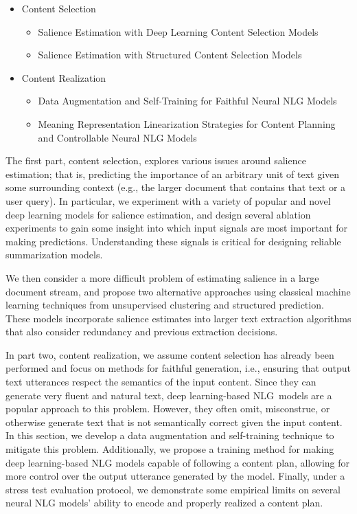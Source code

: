 \begin{itemize}
  \item Content Selection
  \begin{itemize}
    \item Salience Estimation with Deep Learning Content Selection Models
    \item Salience Estimation with Structured Content Selection Models
  \end{itemize}
  \item Content Realization
  \begin{itemize}
    \item Data Augmentation and Self-Training for Faithful Neural NLG Models
    \item Meaning Representation Linearization Strategies for Content Planning
          and Controllable Neural NLG Models
  \end{itemize}
\end{itemize}

The first part, content selection, explores various issues around salience
estimation; that is, predicting the importance of an arbitrary unit of text
given some surrounding context (e.g., the larger document that contains that
text or a user query). In particular, we experiment with a variety of popular
and novel deep learning models for salience estimation, and design several
ablation experiments to gain some insight into which input signals are most
important for making predictions. Understanding these signals is critical for
designing reliable summarization models. 

We then consider a more difficult problem of estimating salience in a large
document stream, and propose two alternative approaches using classical
machine learning techniques from unsupervised clustering and structured
prediction. These models incorporate salience estimates into larger text
extraction algorithms that also consider redundancy and previous extraction
decisions.
    
In part two, content realization, we assume content selection has already been
performed and focus on methods for faithful generation, i.e., ensuring that
output text utterances respect the semantics of the input content. Since they
can generate very fluent and natural text, deep learning-based NLG~models are
a popular approach to this problem. However, they often omit, misconstrue, or
otherwise generate text that is not semantically correct given the input
content. In this section, we develop a data augmentation and self-training
technique to mitigate this problem. Additionally, we propose a training method
for making deep learning-based NLG models capable of following a content plan,
allowing for more control over the output utterance generated by the model.
Finally, under a stress test evaluation protocol, we demonstrate some
empirical limits on several neural NLG models' ability to encode and properly
realized a content plan.
 
